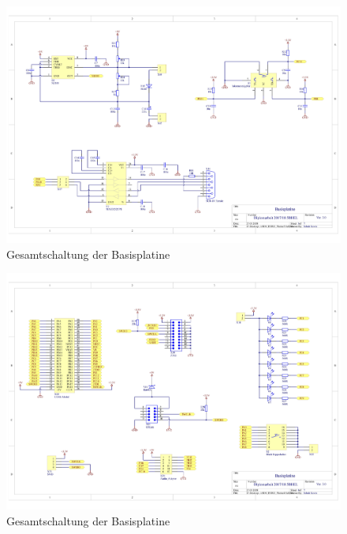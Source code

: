 \begin{figure}[H]\ContinuedFloat
    \centering
    \includegraphics[width=1.25\textwidth,angle=90]{Schuh/Pictures/Basis2-Schaltung3}
    \caption[Gesamtschaltung der Basisplatine]{Gesamtschaltung der \gls{Basisplatine}}
\end{figure}
\begin{figure}[H]\ContinuedFloat
    \centering
    \includegraphics[width=1.25\textwidth,angle=90]{Schuh/Pictures/Basis2-Schaltung4}
    \caption[Gesamtschaltung der Basisplatine]{Gesamtschaltung der \gls{Basisplatine}}
\end{figure}
